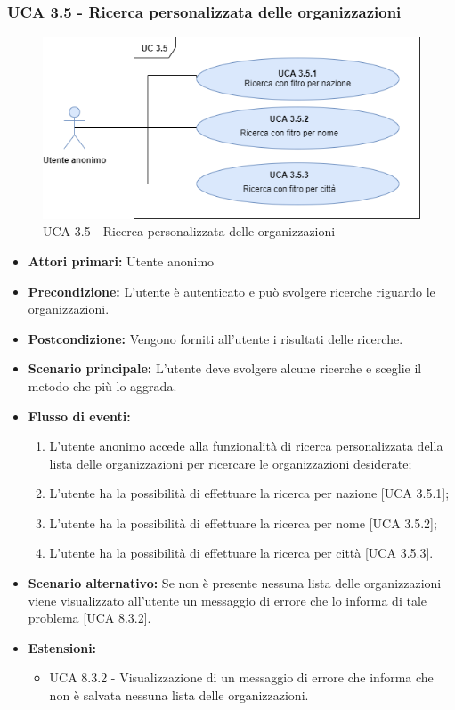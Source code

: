 \subsubsection{UCA 3.5 - Ricerca personalizzata delle organizzazioni}%
\begin{figure}[h]
	\centering
	
	\includegraphics[scale=0.5, center]{Sezioni/UseCase/Immagini/UCA3.5.png}
	\caption{UCA 3.5 - Ricerca personalizzata delle organizzazioni}
\end{figure}
\begin{itemize}
	\item \textbf{Attori primari:} Utente anonimo
	\item \textbf{Precondizione:} L'utente è autenticato e può svolgere ricerche riguardo le organizzazioni.
	\item \textbf{Postcondizione:} Vengono forniti all'utente i risultati delle ricerche.
	\item \textbf{Scenario principale:} L'utente deve svolgere alcune ricerche e sceglie il metodo che più lo aggrada.
	\item \textbf{Flusso di eventi:} 
	\begin{enumerate}
		\item L'utente anonimo accede alla funzionalità di ricerca personalizzata della lista delle organizzazioni per ricercare le organizzazioni desiderate;
		\item L'utente ha la possibilità di effettuare la ricerca per nazione [UCA 3.5.1];
		\item L'utente ha la possibilità di effettuare la ricerca per nome [UCA 3.5.2];
		\item L'utente ha la possibilità di effettuare la ricerca per città [UCA 3.5.3].
	\end{enumerate}
	\item \textbf{Scenario alternativo:} Se non è presente nessuna lista delle organizzazioni viene visualizzato all'utente un messaggio di errore che lo informa di tale problema [UCA 8.3.2].
	\item \textbf{Estensioni:}
	\begin{itemize}
		\item UCA 8.3.2 - Visualizzazione di un messaggio di errore che informa che non è salvata nessuna lista delle organizzazioni.
	\end{itemize}
\end{itemize}

